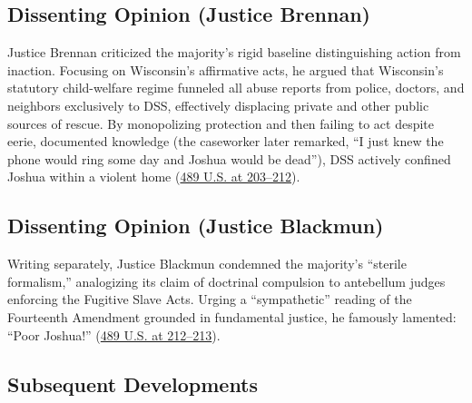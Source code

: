 \documentclass[12pt]{article}
\begin{document}
\subsection{Dissenting Opinion (Justice Brennan)}

Justice Brennan criticized the majority's rigid baseline distinguishing action from inaction. Focusing on Wisconsin's affirmative acts, he argued that Wisconsin's statutory child-welfare regime funneled all abuse reports from police, doctors, and neighbors exclusively to DSS, effectively displacing private and other public sources of rescue. By monopolizing protection and then failing to act despite eerie, documented knowledge (the caseworker later remarked, ``I just knew the phone would ring some day and Joshua would be dead''), DSS actively confined Joshua within a violent home (\href{https://supreme.justia.com/cases/federal/us/489/189/}{489 U.S. at 203--212}).

\subsection{Dissenting Opinion (Justice Blackmun)}

Writing separately, Justice Blackmun condemned the majority's ``sterile formalism,'' analogizing its claim of doctrinal compulsion to antebellum judges enforcing the Fugitive Slave Acts. Urging a ``sympathetic'' reading of the Fourteenth Amendment grounded in fundamental justice, he famously lamented: ``Poor Joshua!'' (\href{https://supreme.justia.com/cases/federal/us/489/189/}{489 U.S. at 212--213}).

\subsection{Subsequent Developments}
\end{document}
